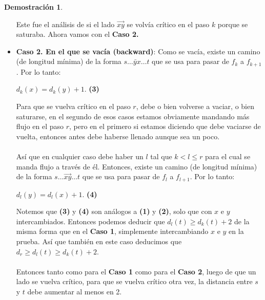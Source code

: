 \documentclass[11pt, a4paper]{article}
\theoremstyle{definition}
\newtheorem*{demostracion}{Demostración}
\begin{document}
\begin{demostracion}
\begin{itemize}
                Este fue el análisis de si el lado $\overrightarrow{xy}$ se volvía crítico en el paso $k$ porque se saturaba. Ahora vamos con el 
                \textbf{Caso 2.}
            
        \item \textbf{Caso 2. En el que se vacía (backward)}: Como se vacía, existe un camino (de longitud mínima) de la forma 
                $s \ldots \overleftarrow{yx} \ldots t$ que se usa para pasar de $f_k$ a $f_{k+1}$. Por lo tanto:
                \begin{center}
                    $d_k(x)=d_k(y)+1$. \textbf{(3)}
                \end{center}
                Para que se vuelva crítico en el paso $r$, debe o bien volverse a vaciar, o bien saturarse, en el segundo de esos casos estamos 
                obviamente mandando más flujo en el paso $r$, pero en el primero si estamos diciendo que debe vaciarse de vuelta, entonces antes 
                debe haberse llenado aunque sea un poco. \\ \\ 
                Así que en cualquier caso debe haber un $l$ tal que $k<l\leq r$ para el cual se manda flujo a través de él. Entonces, existe un camino 
                (de longitud mínima) de la forma $s \ldots \overrightarrow{xy} \ldots t$ que se usa para pasar de $f_l$ a $f_{l+1}$. Por lo tanto:
                \begin{center}
                    $d_l(y)=d_l(x)+1$. \textbf{(4)}
                \end{center}
                Notemos que \textbf{(3)} y \textbf{(4)} son análogos a \textbf{(1)} y \textbf{(2)}, solo que con $x$ e $y$ intercambiados. 
                Entonces podemos deducir que $d_l(t) \geq d_k(t) + 2$ de la misma forma que en el \textbf{Caso 1}, simplemente intercambiando $x$ e $y$
                en la prueba. Así que también en este caso deducimos que $d_r \geq d_l(t) \geq d_k(t)+2$.\\ \\
                Entonces tanto como para el \textbf{Caso 1} como para el \textbf{Caso 2}, luego de que un lado se vuelva crítico, para que se vuelva 
                crítico otra vez, la distancia entre $s$ y $t$ debe aumentar al menos en 2. 
                

\end{itemize}
\end{demostracion}
\end{document}
